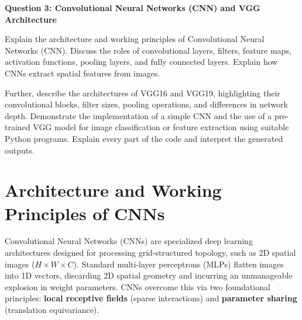 \documentclass[12pt,a4paper]{article}
\begin{document}
{\noindent\LARGE\textbf{Question 3: Convolutional Neural Networks (CNN) and VGG Architecture}}\par
\vspace{0.8em}
\noindent Explain the architecture and working principles of Convolutional Neural Networks (CNN). Discuss the roles of convolutional layers, filters, feature maps, activation functions, pooling layers, and fully connected layers. Explain how CNNs extract spatial features from images.\par\vspace{0.5em}
\noindent Further, describe the architectures of VGG16 and VGG19, highlighting their convolutional blocks, filter sizes, pooling operations, and differences in network depth. Demonstrate the implementation of a simple CNN and the use of a pre-trained VGG model for image classification or feature extraction using suitable Python programs. Explain every part of the code and interpret the generated outputs.
\par\vspace{1.2em}

\section{Architecture and Working Principles of CNNs}
Convolutional Neural Networks (CNNs) are specialized deep learning architectures designed for processing grid-structured topology, such as 2D spatial images ($H \times W \times C$). Standard multi-layer perceptrons (MLPs) flatten images into 1D vectors, discarding 2D spatial geometry and incurring an unmanageable explosion in weight parameters. CNNs overcome this via two foundational principles: \textbf{local receptive fields} (sparse interactions) and \textbf{parameter sharing} (translation equivariance).

\begin{center}
\end{center}
\end{document}
